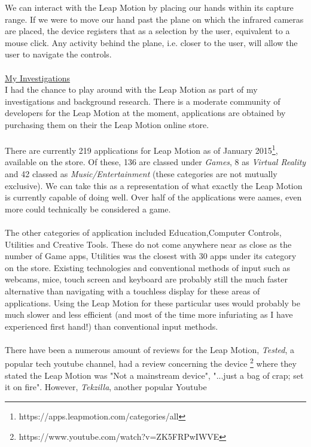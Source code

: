 \documentclass[11pt]{report}
\begin{document}
We can interact with the Leap Motion by placing our hands within its
capture range. If we were to move our hand past the plane on which the
infrared cameras are placed, the device registers that as a selection
by the user, equivalent to a mouse click. Any activity behind the plane,
i.e. closer to the user, will allow the user to navigate the controls.
\\ \\
\underline {My Investigations} \\
I had the chance to play around with the Leap Motion as part of my 
investigations and background research. There is a moderate community
of developers for the Leap Motion at the moment, applications are 
obtained by purchasing them on their the Leap Motion online store. 
\\ \\
There are currently 219 applications for Leap Motion as of January 
2015\footnote{https://apps.leapmotion.com/categories/all}, available
on the store. Of these, 136 are classed under \textit{Games}, 8 as 
\textit{Virtual Reality} and 42 classed as \textit{Music/Entertainment} 
(these categories are not mutually exclusive). We can take this as a 
representation of what exactly the Leap Motion is currently capable of 
doing well. Over half of the applications were aames, even more could 
technically be considered a game. 
\\ \\
The other categories of application included Education,Computer Controls,
Utilities and Creative Tools. These do not come anywhere near as close as 
the number of Game apps, Utilities was the closest with 30 apps under its
category on the store. Existing technologies and conventional methods of 
input such as webcams, mice, touch screen and keyboard are probably 
still the much faster alternative than navigating with a touchless display
for these areas of applications. Using the Leap Motion for these particular 
uses would probably be much slower and less efficient (and most of the time more 
infuriating as I have experienced first hand!) than conventional input methods.  
\\ \\
There have been a numerous amount of reviews for the Leap Motion, 
\textit{Tested}, a popular tech youtube channel, had a review concerning the
device \footnote{https://www.youtube.com/watch?v=ZK5FRPwIWVE} where they
stated the Leap Motion was "Not a mainstream device", "...just a bag
of crap; set it on fire". However, \textit{Tekzilla}, another popular Youtube 
\end{document}
